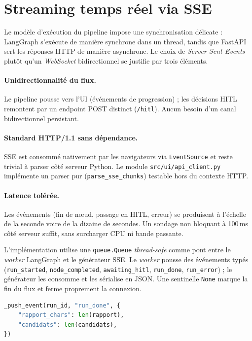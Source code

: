 

\section{Streaming temps réel via SSE}

Le modèle d'exécution du pipeline impose une synchronisation délicate : LangGraph s'exécute de manière synchrone dans un thread, tandis que FastAPI sert les réponses HTTP de manière asynchrone. Le choix de \textit{Server-Sent Events} plutôt qu'un \textit{WebSocket} bidirectionnel se justifie par trois éléments.

\paragraph{Unidirectionnalité du flux.}
Le pipeline pousse vers l'UI (événements de progression) ; les décisions HITL remontent par un endpoint POST distinct (\texttt{/hitl}). Aucun besoin d'un canal bidirectionnel persistant.

\paragraph{Standard HTTP/1.1 sans dépendance.}
SSE est consommé nativement par les navigateurs via \texttt{EventSource} et reste trivial à parser côté serveur Python. Le module \texttt{src/ui/api\_client.py} implémente un parser pur (\texttt{parse\_sse\_chunks}) testable hors du contexte HTTP.

\paragraph{Latence tolérée.}
Les événements (fin de nœud, passage en HITL, erreur) se produisent à l'échelle de la seconde voire de la dizaine de secondes. Un sondage non bloquant à 100\,ms côté serveur suffit, sans surcharger CPU ni bande passante.

L'implémentation utilise une \texttt{queue.Queue} \textit{thread-safe} comme pont entre le \textit{worker} LangGraph et le générateur SSE. Le \textit{worker} pousse des événements typés (\texttt{run\_started}, \texttt{node\_completed}, \texttt{awaiting\_hitl}, \texttt{run\_done}, \texttt{run\_error}) ; le générateur les consomme et les sérialise en JSON. Une sentinelle \texttt{None} marque la fin du flux et ferme proprement la connexion.

\begin{lstlisting}[language=Python,caption={Émission d'un événement typé (\texttt{src/api.py})}]
_push_event(run_id, "run_done", {
    "rapport_chars": len(rapport),
    "candidats": len(candidats),
})
\end{lstlisting}

